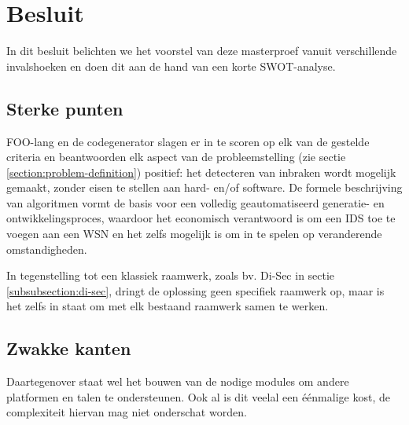 \chapter{Besluit}
\label{besluit}


In dit besluit belichten we het voorstel van deze masterproef vanuit
verschillende invalshoeken en doen dit aan de hand van een korte SWOT-analyse.

\section{Sterke punten}
\label{section:strenghts}

FOO-lang en de codegenerator slagen er in te scoren op elk van de gestelde
criteria en beantwoorden elk aspect van de probleemstelling (zie sectie
\ref{section:problem-definition}) positief: het detecteren van inbraken wordt
mogelijk gemaakt, zonder eisen te stellen aan hard- en/of software. De formele
beschrijving van algoritmen vormt de basis voor een volledig geautomatiseerd
generatie- en ontwikkelingsproces, waardoor het economisch verantwoord is om
een IDS toe te voegen aan een WSN en het zelfs mogelijk is om in te spelen op
veranderende omstandigheden.

In tegenstelling tot een klassiek raamwerk, zoals bv. Di-Sec in sectie
\ref{subsubsection:di-sec}, dringt de oplossing geen specifiek raamwerk op,
maar is het zelfs in staat om met elk bestaand raamwerk samen te werken.

\section{Zwakke kanten}
\label{section:weaknesses}

Daartegenover staat wel het bouwen van de nodige modules om andere platformen
en talen te ondersteunen. Ook al is dit veelal een \'e\'enmalige kost, de
complexiteit hiervan mag niet onderschat worden.

